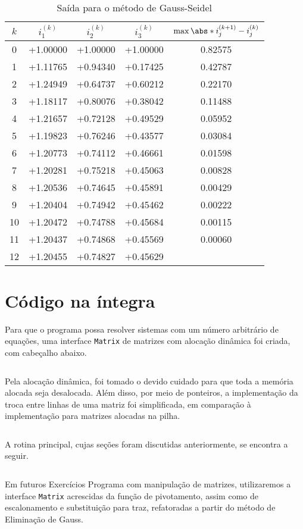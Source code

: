 \documentclass[portuguese,minted]{artigo}
\begin{document}
\begin{table}[H]
    \centering
    \caption{Saída para o método de Gauss-Seidel}
    \begin{tabular}{c c c c c}
        \toprule
        \(k\) & \(i^{(k)}_1\) & \(i^{(k)}_2\) & \(i^{(k)}_3\) & \(\max{\abs*{i^{(k+1)}_{j} - i^{(k)}_j}}\)\\
        \midrule
        0&+1.00000&+1.00000&+1.00000&0.82575\\
        1&+1.11765&+0.94340&+0.17425&0.42787\\
        2&+1.24949&+0.64737&+0.60212&0.22170\\
        3&+1.18117&+0.80076&+0.38042&0.11488\\
        4&+1.21657&+0.72128&+0.49529&0.05952\\
        5&+1.19823&+0.76246&+0.43577&0.03084\\
        6&+1.20773&+0.74112&+0.46661&0.01598\\
        7&+1.20281&+0.75218&+0.45063&0.00828\\
        8&+1.20536&+0.74645&+0.45891&0.00429\\
        9&+1.20404&+0.74942&+0.45462&0.00222\\
        10&+1.20472&+0.74788&+0.45684&0.00115\\
        11&+1.20437&+0.74868&+0.45569&0.00060\\
        12&+1.20455&+0.74827&+0.45629&\\
        \bottomrule
    \end{tabular}
    \label{tab:gauss_seidel}
\end{table}
\section{Código na íntegra}
Para que o programa possa resolver sistemas com um número arbitrário de equações, uma interface \verb|Matrix| de matrizes com alocação dinâmica foi criada, com cabeçalho abaixo. 
\inputminted[fontsize=\footnotesize]{c}{src/matrix.h}

Pela alocação dinâmica, foi tomado o devido cuidado para que toda a memória alocada seja desalocada. Além disso, por meio de ponteiros, a implementação da troca entre linhas de uma matriz foi simplificada, em comparação à implementação para matrizes alocadas na pilha.
\inputminted[fontsize=\small]{c}{src/matrix.c}

A rotina principal, cujas seções foram discutidas anteriormente, se encontra a seguir.
\inputminted[fontsize=\small]{c}{src/main.c}

Em futuros Exercícios Programa com manipulação de matrizes, utilizaremos a interface \verb|Matrix| acrescidas da função de pivotamento, assim como de escalonamento e substituição para traz, refatoradas a partir do método de Eliminação de Gauss.
\end{document}
